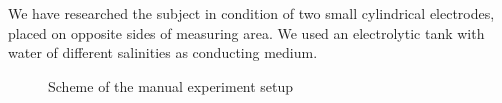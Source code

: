 \documentclass{article}
\begin{document}
We have researched the subject in condition of two small cylindrical electrodes, placed on opposite sides of measuring area. We used an electrolytic tank with water of different salinities as conducting medium.



\begin{figure}[h]
	\begin{center}
		\begin{minipage}[h]{0.47\linewidth}
			\caption{Scheme of the manual experiment setup}
			\label{fig:mesh1}
		\end{minipage}
		\hfill
		\begin{minipage}[h]{0.47\linewidth}

\end{minipage}
\end{center}
\end{figure}
\end{document}
